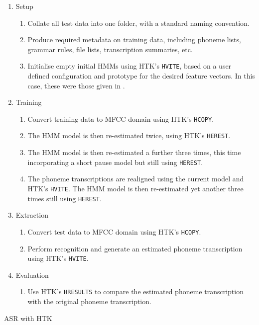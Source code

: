 \begin{algorithm}
\begin{enumerate}
\item Setup

\begin{enumerate}
\item Collate all test data into one folder, with a standard naming convention.
\item Produce required metadata on training data, including phoneme lists,
grammar rules, file lists, transcription summaries, etc.
\item Initialise empty initial \acp{HMM} using \ac{HTK}'s \lstinline[language=bash]!HVITE!,
based on a user defined configuration and prototype for the desired
feature vectors. In this case, these were those given in .
\end{enumerate}
\item Training

\begin{enumerate}
\item Convert training data to \ac{MFCC} domain using \ac{HTK}'s \lstinline[language=bash]!HCOPY!.
\item The \ac{HMM} model is then re-estimated twice, using \ac{HTK}'s
\lstinline[language=bash]!HEREST!.
\item The \ac{HMM} model is then re-estimated a further three times, this
time incorporating a short pause model but still using \lstinline[language=bash]!HEREST!.
\item The phoneme transcriptions are realigned using the current model and
\ac{HTK}'s \lstinline[language=bash]!HVITE!. The \ac{HMM} model
is then re-estimated yet another three times still using \lstinline[language=bash]!HEREST!.
\end{enumerate}
\item Extraction

\begin{enumerate}
\item Convert test data to \ac{MFCC} domain using \ac{HTK}'s \lstinline[language=bash]!HCOPY!.
\item Perform recognition and generate an estimated phoneme transcription
using \ac{HTK}'s \lstinline[language=bash]!HVITE!.
\end{enumerate}
\item Evaluation

\begin{enumerate}
\item Use \ac{HTK}'s \lstinline[language=bash]!HRESULTS! to compare the
estimated phoneme transcription with the original phoneme transcription.
\end{enumerate}
\end{enumerate}
\protect\caption{\label{alg:ASR} \acs{ASR} with \acs{HTK}}
\end{algorithm}


